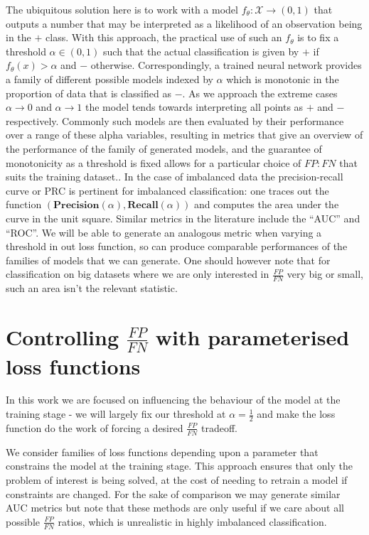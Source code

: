\documentclass[10pt,a4paper]{article}
\begin{document}
The ubiquitous solution here is to work with a model $f_\theta:\mathcal X\rightarrow(0,1)$ that outputs a number that may be interpreted as a likelihood of an observation being in the $+$ class.
With this approach, the practical use of such an $f_\theta$ is to fix a threshold $\alpha\in(0,1)$ such that the actual classification is given by $+$ if $f_\theta(x)>\alpha$ and $-$ otherwise.
Correspondingly, a trained neural network provides a family of different possible models indexed by $\alpha$ which is monotonic in the proportion of data that is classified as $-$.
As we approach the extreme cases $\alpha\rightarrow0$ and $\alpha\rightarrow1$ the model tends towards interpreting all points as $+$ and $-$ respectively.
Commonly such models are then evaluated by their performance over a range of these alpha variables, resulting in metrics that give an overview of the performance of the family of generated models, and the guarantee of monotonicity as a threshold is fixed allows for a particular choice of $FP:FN$ that suits the training dataset..
In the case of imbalanced data the precision-recall curve or PRC is pertinent for imbalanced classification: one traces out the function $(\textbf{Precision}(\alpha),\textbf{Recall}(\alpha))$ and computes the area under the curve in the unit square.
Similar metrics in the literature include the ``AUC'' and ``ROC''.
We will be able to generate an analogous metric when varying a threshold in out loss function, so can produce comparable performances of the families of models that we can generate.
One should however note that for classification on big datasets where we are only interested in $\tfrac{FP}{FN}$ very big or small, such an area isn't the relevant statistic.
\section{Controlling $\tfrac{FP}{FN}$ with parameterised loss functions}

In this work we are focused on influencing the behaviour of the model at the training stage - we will largely fix our threshold at $\alpha=\tfrac12$ and make the loss function do the work of forcing a desired $\tfrac{FP}{FN}$ tradeoff.

We consider families of loss functions depending upon a parameter that constrains the model at the training stage.
This approach ensures that only the problem of interest is being solved, at the cost of needing to retrain a model if constraints are changed.
For the sake of comparison we may generate similar AUC metrics but note that these methods are only useful if we care about all possible $\tfrac{FP}{FN}$ ratios, which is unrealistic in highly imbalanced classification.
\end{document}

